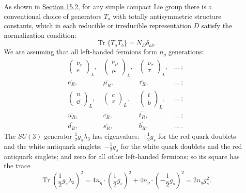 As shown in \hyperref[sec:15.2]{Section 15.2}, for any simple compact Lie group there is a conventional choice of generators $T_a$ with totally antisymmetric structure constants, which in each reducible or irreducible representation $D$ satisfy the normalization condition:
\begin{equation}
\operatorname{Tr}\{T_a T_b\}=N_D\delta_{ab}.
\tag{21.5.1}\label{eq:21.5.1}
\end{equation}
We are assuming that all left-handed fermions form $n_g$ generations:
\[
\begin{array}{cccccc}
\begin{pmatrix}\nu_e\\ e\end{pmatrix}_{\!L},
&
\begin{pmatrix}\nu_\mu\\ \mu\end{pmatrix}_{\!L},
&
\begin{pmatrix}\nu_\tau\\ \tau\end{pmatrix}_{\!L},
&
\ldots\,;
\\[7pt]
\overline{e_R},
&
\overline{\mu_R},
&
\overline{\tau_R},
&
\ldots\,;
\\[7pt]
\begin{pmatrix}u\\ \dd\end{pmatrix}_{\!L},
&
\begin{pmatrix}c\\ s\end{pmatrix}_{\!L},
&
\begin{pmatrix}t\\ b\end{pmatrix}_{\!L},
&
\ldots\,;
\\[7pt]
\overline{u_R},
&
\overline{c_R},
&
\overline{t_R},
&
\ldots\,;
\\[7pt]
\overline{d_R},
&
\overline{s_R},
&
\overline{b_R},
&
\ldots\,.
\end{array}
\]
The $SU(3)$ generator $\frac{1}{2}g_s\lambda_3$ has eigenvalues: $+\frac{1}{2}g_s$ for the red quark doublets and the white antiquark singlets; $-\frac{1}{2}g_s$ for the white quark doublets and the red antiquark singlets; and zero for all other left-handed fermions; so its square has the trace
\begin{equation}
\operatorname{Tr}\left(\frac{1}{2}g_s\lambda_3\right)^2
=4n_g\cdot\left(\frac{1}{2}g_s\right)^2
+4n_g\cdot\left(-\frac{1}{2}g_s\right)^2
=2n_gg_s^2.
\tag{21.5.2}\label{eq:21.5.2}
\end{equation}
